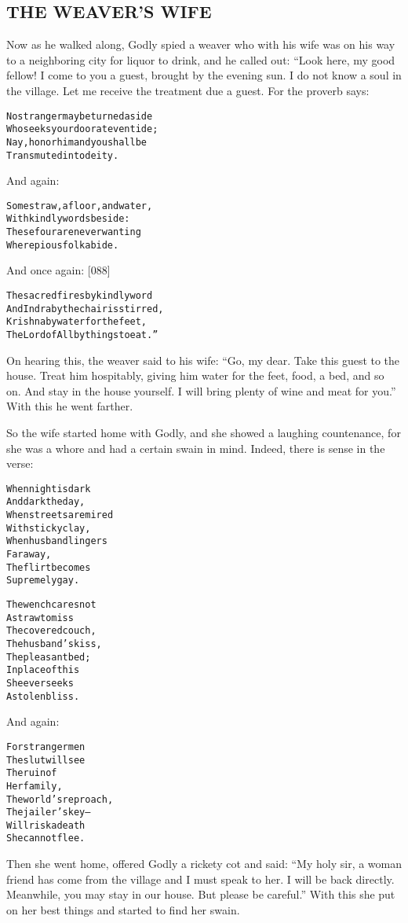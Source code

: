 \documentclass{article}
\renewenvironment{verbatim}{\begin{alltt}\normalfont\begin{centering}}{\end{centering}\end{alltt}}
\begin{document}
\subsection{THE WEAVER'S WIFE}

Now as he walked along, Godly spied a weaver who with his wife was
on his way to a neighboring city for liquor to drink, and he called
out: “Look here, my good fellow! I come to you a guest, brought by
the evening sun. I do not know a soul in the village. Let me
receive the treatment due a guest. For the proverb says:

\begin{verbatim}
No stranger may be turned aside
Who seeks your door at eventide;
Nay, honor him and you shall be
Transmuted into deity.
\end{verbatim}
And again:

\begin{verbatim}
Some straw, a floor, and water,
    With kindly words beside:
These four are never wanting
    Where pious folk abide.
\end{verbatim}
And once again: [088]

\begin{verbatim}
The sacred fires by kindly word
And Indra by the chair is stirred,
Krishna by water for the feet,
The Lord of All by things to eat.”
\end{verbatim}
On hearing this, the weaver said to his wife:
``Go, my dear. Take this guest to the house. Treat him hospitably, giving him water for the feet, food, a bed, and so on. And stay in the house yourself. I will bring plenty of wine and meat for you.''
With this he went farther.

So the wife started home with Godly, and she showed a laughing
countenance, for she was a whore and had a certain swain in mind.
Indeed, there is sense in the verse:

\begin{verbatim}
When night is dark
    And dark the day,
When streets are mired
    With sticky clay,
When husband lingers
    Far away,
The flirt becomes
    Supremely gay.

The wench cares not
    A straw to miss
The covered couch,
    The husband's kiss,
The pleasant bed;
    In place of this
She ever seeks
    A stolen bliss.
\end{verbatim}
And again:

\begin{verbatim}
For stranger men
    The slut will see
The ruin of
    Her family,
The world's reproach,
    The jailer's key--
Will risk a death
    She cannot flee.
\end{verbatim}
Then she went home, offered Godly a rickety cot and said:
``My holy sir, a woman friend has come from the village and I must speak to her. I will be back directly. Meanwhile, you may stay in our house. But please be careful.''
With this she put on her best things and started to find her
swain.
\end{document}
